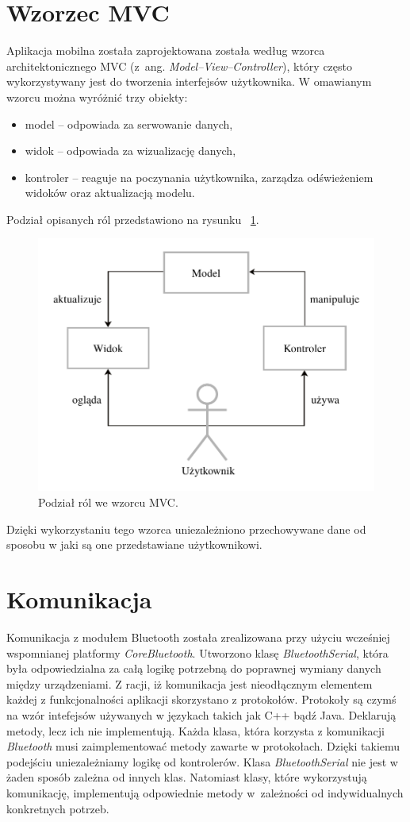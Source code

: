 \section{Wzorzec MVC}
Aplikacja mobilna została zaprojektowana została według wzorca architektonicznego MVC (z~ang. \textit{Model–View–Controller}), który często wykorzystywany jest do tworzenia interfejsów użytkownika. W omawianym wzorcu można wyróżnić trzy obiekty:
\begin{itemize}
\item model – odpowiada za serwowanie danych,
\item widok – odpowiada za wizualizację danych, 
\item kontroler – reaguje na poczynania użytkownika, zarządza odświeżeniem widoków oraz aktualizacją modelu. 
\end{itemize}
Podział opisanych ról przedstawiono na rysunku ~\ref{fig:mvc}.
\begin{figure}[H]
	\centering
		\includegraphics[width=0.75\linewidth]{pic05/mvc.pdf}
	\caption{Podział ról we wzorcu MVC.}
	\label{fig:mvc}	
\end{figure}

Dzięki wykorzystaniu tego wzorca uniezależniono przechowywane dane od sposobu w jaki są one przedstawiane użytkownikowi.

\section{Komunikacja}
Komunikacja z modułem Bluetooth została zrealizowana przy użyciu wcześniej wspomnianej platformy \textit{CoreBluetooth}. Utworzono klasę \textit{BluetoothSerial}, która była odpowiedzialna za całą logikę potrzebną do poprawnej wymiany danych między urządzeniami. Z racji, iż komunikacja jest nieodłącznym elementem każdej z funkcjonalności aplikacji skorzystano z protokołów. Protokoły są czymś na wzór intefejsów używanych w językach takich jak C++ bądź Java. Deklarują metody, lecz ich nie implementują. Każda klasa, która korzysta z komunikacji \textit{Bluetooth} musi zaimplementować metody zawarte w protokołach. Dzięki takiemu podejściu uniezależniamy logikę od kontrolerów. Klasa \textit{BluetoothSerial} nie jest w żaden sposób zależna od innych klas. Natomiast klasy, które wykorzystują komunikację, implementują odpowiednie metody w~zależności od indywidualnych konkretnych potrzeb.

